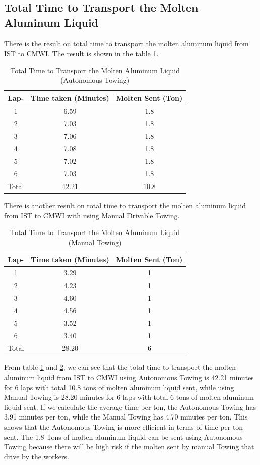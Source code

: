 \documentclass[conference, a4paper]{IEEEtran}[2015/08/26]
\begin{document}
\subsection{Total Time to Transport the Molten Aluminum Liquid}
There is the result on total time to transport the molten aluminum liquid from IST to CMWI. The result is shown in the table \ref{tab:total_time_transport}.
\begin{table}[H]
	\centering
	\caption{Total Time to Transport the Molten Aluminum Liquid (Autonomous Towing)}
	\label{tab:total_time_transport}
	\begin{tabular}{|c|c|c|}
		\hline
		\textbf{Lap-} & \textbf{Time taken (Minutes)} & \textbf{Molten Sent (Ton)} \\ \hline
		1 & 6.59 & 1.8 \\ \hline
		2 & 7.03 & 1.8 \\ \hline
		3 & 7.06 & 1.8 \\ \hline
		4 & 7.08 & 1.8 \\ \hline
		5 & 7.02 & 1.8 \\ \hline
		6 & 7.03 & 1.8 \\ \hline
		Total & 42.21 & 10.8 \\ \hline
	\end{tabular}
\end{table} 

There is another result on total time to transport the molten aluminum liquid from IST to CMWI with using Manual Drivable Towing. 

\begin{table}[H]
	\centering
	\caption{Total Time to Transport the Molten Aluminum Liquid (Manual Towing)}
	\label{tab:total_time_transport_manual}
	\begin{tabular}{|c|c|c|}
		\hline
		\textbf{Lap-} & \textbf{Time taken (Minutes)} & \textbf{Molten Sent (Ton)} \\ \hline
		1 & 3.29 & 1 \\ \hline
		2 & 4.23 & 1 \\ \hline
		3 & 4.60 & 1 \\ \hline
		4 & 4.56 & 1 \\ \hline
		5 & 3.52 & 1 \\ \hline
		6 & 3.40 & 1 \\ \hline
		Total & 28.20 & 6 \\ \hline
	\end{tabular}
\end{table} 

From table \ref{tab:total_time_transport} and \ref{tab:total_time_transport_manual}, we can see that the total time to transport the molten aluminum liquid from IST to CMWI using Autonomous Towing is 42.21 minutes for 6 laps with total 10.8 tons of molten aluminum liquid sent, while using Manual Towing is 28.20 minutes for 6 laps with total 6 tons of molten aluminum liquid sent. If we calculate the average time per ton, the Autonomous Towing has 3.91 minutes per ton, while the Manual Towing has 4.70 minutes per ton. This shows that the Autonomous Towing is more efficient in terms of time per ton sent. The 1.8 Tons of molten aluminum liquid can be sent using Autonomous Towing because there will be high risk if the molten sent by manual Towing that drive by the workers.
\end{document}
